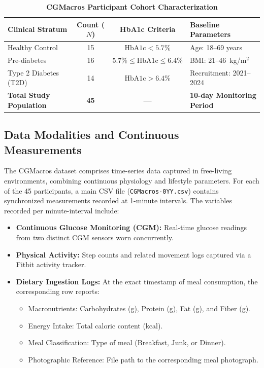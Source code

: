 \documentclass[12pt]{article}
\begin{document}
\begin{table}[H]
    \centering
    \caption{\textbf{CGMacros Participant Cohort Characterization}}
    \label{tab:cohort_demographics}
    \renewcommand{\arraystretch}{1.3}
    \begin{tabular}{lccl}
        \toprule
        \rowcolor{gray!15}
        \textbf{Clinical Stratum} & \textbf{Count ($N$)} & \textbf{HbA1c Criteria} & \textbf{Baseline Parameters} \\
        \midrule
        Healthy Control & 15 & $\text{HbA1c} < 5.7\%$ & Age: 18--69 years \\
        Pre-diabetes & 16 & $5.7\% \le \text{HbA1c} \le 6.4\%$ & BMI: 21--46~kg/m$^2$ \\
        Type 2 Diabetes (T2D) & 14 & $\text{HbA1c} > 6.4\%$ & Recruitment: 2021--2024 \\
        \midrule
        \textbf{Total Study Population} & \textbf{45} & \textbf{---} & \textbf{10-day Monitoring Period} \\
        \bottomrule
    \end{tabular}
\end{table}

\subsection{Data Modalities and Continuous Measurements}
The CGMacros dataset comprises time-series data captured in free-living environments, combining continuous physiology and lifestyle parameters. For each of the 45 participants, a main CSV file (\texttt{CGMacros-0YY.csv}) contains synchronized measurements recorded at 1-minute intervals. 
The variables recorded per minute-interval include:
\begin{itemize}[leftmargin=*, noitemsep]
    \item \textbf{Continuous Glucose Monitoring (CGM):} Real-time glucose readings from two distinct CGM sensors worn concurrently.
    \item \textbf{Physical Activity:} Step counts and related movement logs captured via a Fitbit activity tracker.
    \item \textbf{Dietary Ingestion Logs:} At the exact timestamp of meal consumption, the corresponding row reports:
    \begin{itemize}[leftmargin=*, noitemsep]
        \item {Macronutrients:} Carbohydrates (g), Protein (g), Fat (g), and Fiber (g).
        \item {Energy Intake:} Total caloric content (kcal).
        \item {Meal Classification:} Type of meal (Breakfast, Junk, or Dinner).
        \item {Photographic Reference:} File path to the corresponding meal photograph.
    \end{itemize}
\end{itemize}
\end{document}
